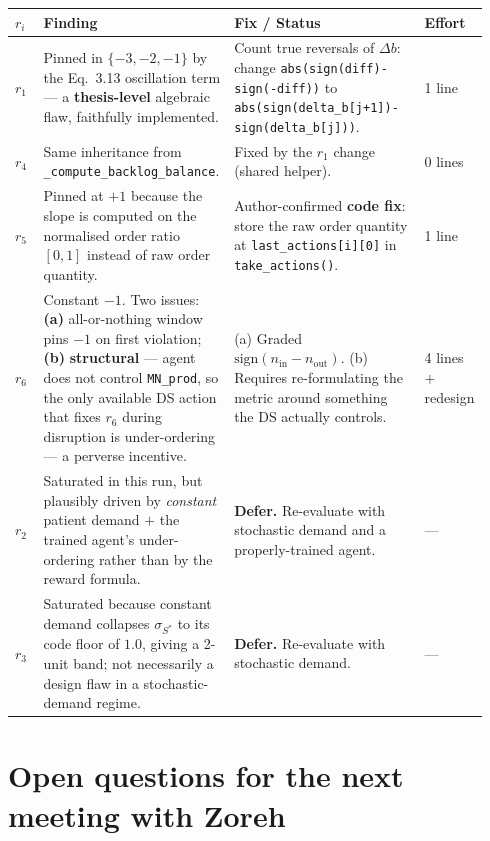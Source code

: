 \documentclass[11pt,letterpaper]{article}
\newcommand{\code}[1]{\texttt{\small #1}}
\begin{document}
\begin{longtable}{p{0.06\linewidth} p{0.36\linewidth} p{0.40\linewidth} p{0.12\linewidth}}
\toprule
\textbf{$r_i$} & \textbf{Finding} & \textbf{Fix / Status} & \textbf{Effort} \\
\midrule
$r_1$ & Pinned in $\{-3,-2,-1\}$ by the Eq.~3.13 oscillation term --- a \textbf{thesis-level} algebraic flaw, faithfully implemented. & Count true reversals of $\Delta b$: change \code{abs(sign(diff){-}sign(-diff))} to \code{abs(sign(delta\_b[j+1]){-}sign(delta\_b[j]))}. & 1 line \\
\addlinespace
$r_4$ & Same inheritance from \code{\_compute\_backlog\_balance}. & Fixed by the $r_1$ change (shared helper). & 0 lines \\
\addlinespace
$r_5$ & Pinned at $+1$ because the slope is computed on the normalised order ratio $[0,1]$ instead of raw order quantity. & Author-confirmed \textbf{code fix}: store the raw order quantity at \code{last\_actions[i][0]} in \code{take\_actions()}. & 1 line \\
\addlinespace
$r_6$ & Constant $-1$.  Two issues: \textbf{(a)} all-or-nothing window pins $-1$ on first violation; \textbf{(b)} \textbf{structural} --- agent does not control \code{MN\_prod}, so the only available DS action that fixes $r_6$ during disruption is under-ordering --- a perverse incentive. & (a) Graded $\mathrm{sign}(n_{\text{in}}{-}n_{\text{out}})$. (b) Requires re-formulating the metric around something the DS actually controls. & 4 lines $+$ redesign \\
\addlinespace
$r_2$ & Saturated in this run, but plausibly driven by \emph{constant} patient demand $+$ the trained agent's under-ordering rather than by the reward formula. & \textbf{Defer.}  Re-evaluate with stochastic demand and a properly-trained agent. & --- \\
\addlinespace
$r_3$ & Saturated because constant demand collapses $\sigma_{S^*}$ to its code floor of $1.0$, giving a 2-unit band; not necessarily a design flaw in a stochastic-demand regime. & \textbf{Defer.}  Re-evaluate with stochastic demand. & --- \\
\bottomrule
\end{longtable}

\section{Open questions for the next meeting with Zoreh}
\end{document}
